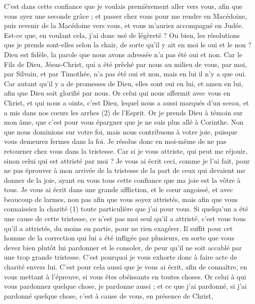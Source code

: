 \begin{multicols}{2}
C’est dans cette confiance que je voulais premièrement aller vers vous, afin que vous ayez une seconde grâce ;
et passer chez vous pour me rendre en Macédoine, puis revenir de la Macédoine vers vous, et vous m’auriez accompagné en Judée.
Est-ce que, en voulant cela, j’ai donc usé de légèreté ? Ou bien, les résolutions que je prends sont-elles selon la chair, de sorte qu’il y ait en moi le oui et le non ?
Dieu est fidèle, la parole que nous avons adressée n’a pas été oui et non.
Car le Fils de Dieu, Jésus-Christ, qui a été prêché par nous au milieu de vous, par moi, par Silvain, et par Timothée, n'a pas été oui et non, mais en lui il n’y a que oui.
Car autant qu’il y a de promesses de Dieu, elles sont oui en lui, et amen en lui, afin que Dieu soit glorifié par nous.
Or celui qui nous affermit avec vous en Christ, et qui nous a oints, c'est Dieu,
lequel nous a aussi marqués d’un sceau, et a mis dans nos cœurs les arrhes (2) de l'Esprit.
Or je prends Dieu à témoin sur mon âme, que c’est pour vous épargner que je ne suis plus allé à Corinthe.
Non que nous dominions sur votre foi, mais nous contribuons à votre joie, puisque vous demeurez fermes dans la foi.
\VerseOne{}Je résolus donc en moi-même de ne pas retourner chez vous dans la tristesse.
Car si je vous attriste, qui peut me réjouir, sinon celui qui est attristé par moi ?
Je vous ai écrit ceci, comme je l’ai fait, pour ne pas éprouver à mon arrivée de la tristesse de la part de ceux qui devaient me donner de la joie, ayant en vous tous cette confiance que ma joie est la vôtre à tous.
Je vous ai écrit dans une grande affliction, et le cœur angoissé, et avec beaucoup de larmes, non pas afin que vous soyez attristés, mais afin que vous connaissiez la charité (1) toute particulière que j'ai pour vous.
Si quelqu'un a été une cause de cette tristesse, ce n'est pas moi seul qu'il a attristé, c'est vous tous qu'il a attristés, du moins en partie, pour ne rien exagérer.
Il suffit pour cet homme de la correction qui lui a été infligée par plusieurs,
en sorte que vous devez bien plutôt lui pardonner et le consoler, de peur qu’il ne soit accablé par une trop grande tristesse.
C'est pourquoi je vous exhorte donc à faire acte de charité envers lui.
C’est pour cela aussi que je vous ai écrit, afin de connaître, en vous mettant à l’épreuve, si vous êtes obéissants en toutes choses.
Or celui à qui vous pardonnez quelque chose, je pardonne aussi ; et ce que j’ai pardonné, si j’ai pardonné quelque chose, c’est à cause de vous, en présence de Christ,

\end{multicols}
